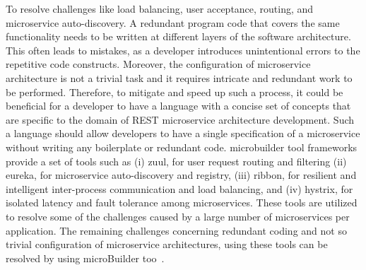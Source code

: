 \par To resolve challenges like load balancing, user acceptance, routing, and microservice auto-discovery. A redundant program code that covers the same functionality needs to be written at different layers of the software architecture. This often leads to mistakes, as a developer introduces unintentional errors to the repetitive code constructs. Moreover, the configuration of microservice architecture is not a trivial task and it requires intricate and redundant work to be performed. Therefore, to mitigate and speed up such a process, it could be beneficial for a developer to have a language with a concise set of concepts that are specific to the domain of REST microservice architecture development. Such a language should allow developers to have a single specification of a microservice without writing any boilerplate or redundant code.
microbuilder tool frameworks provide a set of tools such as (i) zuul, for user request routing and filtering (ii) eureka, for microservice auto-discovery and registry, (iii) ribbon, for resilient and intelligent inter-process communication and load balancing, and (iv) hystrix, for isolated latency and fault tolerance among microservices. These tools are utilized to resolve some of the challenges caused by a large number of microservices per application. The remaining challenges concerning redundant coding and not so trivial configuration of microservice architectures, using these tools can be resolved by using microBuilder too~\cite{Branko2018}.





